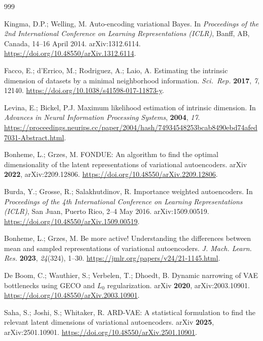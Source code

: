\documentclass[make,article,submit,pdftex,moreauthors]{Definitions/mdpi}
\begin{document}
\begin{thebibliography}{999}

Kingma, D.P.; Welling, M.
Auto-encoding variational Bayes.
In \textit{Proceedings of the 2nd International Conference on Learning
Representations (ICLR)}, Banff, AB, Canada, 14--16 April 2014.
arXiv:1312.6114. \url{https://doi.org/10.48550/arXiv.1312.6114}.

Facco, E.; d'Errico, M.; Rodriguez, A.; Laio, A.
Estimating the intrinsic dimension of datasets by a minimal neighborhood
information.
\textit{Sci.\ Rep.} \textbf{2017}, \textit{7}, 12140.
\url{https://doi.org/10.1038/s41598-017-11873-y}.

Levina, E.; Bickel, P.J.
Maximum likelihood estimation of intrinsic dimension.
In \textit{Advances in Neural Information Processing Systems},
\textbf{2004}, \textit{17}.
\url{https://proceedings.neurips.cc/paper/2004/hash/74934548253bcab8490ebd74afed7031-Abstract.html}.

Bonheme, L.; Grzes, M.
FONDUE: An algorithm to find the optimal dimensionality of the latent
representations of variational autoencoders.
arXiv \textbf{2022}, arXiv:2209.12806.
\url{https://doi.org/10.48550/arXiv.2209.12806}.

Burda, Y.; Grosse, R.; Salakhutdinov, R.
Importance weighted autoencoders.
In \textit{Proceedings of the 4th International Conference on Learning
Representations (ICLR)}, San Juan, Puerto Rico, 2--4 May 2016.
arXiv:1509.00519. \url{https://doi.org/10.48550/arXiv.1509.00519}.

Bonheme, L.; Grzes, M.
Be more active! Understanding the differences between mean and sampled
representations of variational autoencoders.
\textit{J. Mach. Learn. Res.} \textbf{2023}, \textit{24}(324), 1--30.
\url{https://jmlr.org/papers/v24/21-1145.html}.

De Boom, C.; Wauthier, S.; Verbelen, T.; Dhoedt, B.
Dynamic narrowing of VAE bottlenecks using GECO and $L_0$ regularization.
arXiv \textbf{2020}, arXiv:2003.10901.
\url{https://doi.org/10.48550/arXiv.2003.10901}.

Saha, S.; Joshi, S.; Whitaker, R.
ARD-VAE: A statistical formulation to find the relevant latent dimensions
of variational autoencoders.
arXiv \textbf{2025}, arXiv:2501.10901.
\url{https://doi.org/10.48550/arXiv.2501.10901}.


\end{thebibliography}
\end{document}
